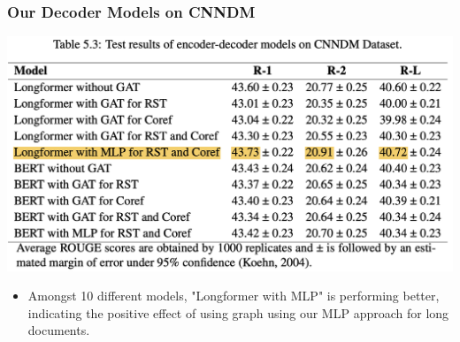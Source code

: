 \documentclass{beamer}
\begin{document}
\begin{frame}
\frametitle{Our Decoder Models on CNNDM}

   \begin{minipage}[t][0.5\textheight][t]{\textwidth}
      \centering
      \includegraphics[width=\textwidth]{imgs/table53_highlight.png} 
  \end{minipage}

  \vfill

  \begin{minipage}[t][0.3\textheight][t]{\textwidth}
    \begin{itemize}
      \item Amongst 10 different models, "Longformer with MLP" is performing better, indicating the positive effect of using graph using our MLP approach for long documents.
    \end{itemize}
  \end{minipage}
 
\end{frame}
\end{document}
